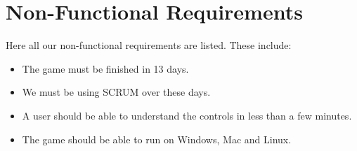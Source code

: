 \chapter{Non-Functional Requirements}

Here all our non-functional requirements are listed. These include: 

\begin{itemize}
\itemsep0em
	\item The game must be finished in 13 days.
	\item We must be using SCRUM over these days.
	\item A user should be able to understand the controls in less than a few minutes.
	\item The game should be able to run on Windows, Mac and Linux.
\end{itemize}